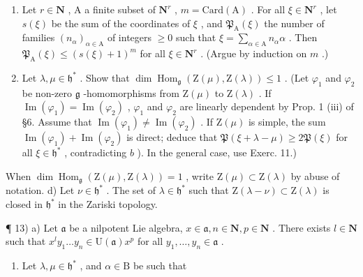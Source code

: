 \begin{enumerate}
\def\labelenumi{\alph{enumi})}
\setcounter{enumi}{1}
\item
  Let \(r \in \mathbf{N}\) , A a finite subset of \(\mathbf{N}^r\) , \(m = \mathrm{Card}(\mathrm{A})\) . For all \(\xi \in \mathbf{N}^r\) , let \(s(\xi)\) be the sum of the coordinates of \(\xi\) , and \(\mathfrak{P}_{\mathrm{A}}(\xi)\) the number of families \((n_{\alpha})_{\alpha \in \mathrm{A}}\) of integers \(\geq 0\) such that \(\xi = \sum_{\alpha \in \mathrm{A}} n_{\alpha}\alpha\) . Then \(\mathfrak{P}_{\mathrm{A}}(\xi) \leq (s(\xi) + 1)^m\) for all \(\xi \in \mathbf{N}^r\) . (Argue by induction on \(m\) .)
\item
  Let \(\lambda, \mu \in \mathfrak{h}^*\) . Show that \(\dim \operatorname{Hom}_{\mathfrak{g}}(\mathrm{Z}(\mu), \mathrm{Z}(\lambda)) \leq 1\) . (Let \(\varphi_1\) and \(\varphi_2\) be non-zero \(\mathfrak{g}\) -homomorphisms from \(\mathrm{Z}(\mu)\) to \(\mathrm{Z}(\lambda)\) . If \(\operatorname{Im}(\varphi_1) = \operatorname{Im}(\varphi_2)\) , \(\varphi_1\) and \(\varphi_2\) are linearly dependent by Prop. 1 (iii) of §6. Assume that \(\operatorname{Im}(\varphi_1) \neq \operatorname{Im}(\varphi_2)\) . If \(\mathrm{Z}(\mu)\) is simple, the sum \(\operatorname{Im}(\varphi_1) + \operatorname{Im}(\varphi_2)\) is direct; deduce that \(\mathfrak{P}(\xi + \lambda - \mu) \geq 2\mathfrak{P}(\xi)\) for all \(\xi \in \mathfrak{h}^*\) , contradicting \(b\) ). In the general case, use Exerc. 11.)
\end{enumerate}

When \(\dim\operatorname{Hom}_{\mathfrak{g}}(\mathrm{Z}(\mu),\mathrm{Z}(\lambda))=1\) , write \(\mathrm{Z}(\mu)\subset\mathrm{Z}(\lambda)\) by abuse of notation. d) Let \(\nu\in\mathfrak{h}^{*}\) . The set of \(\lambda\in\mathfrak{h}^{*}\) such that \(\mathrm{Z}(\lambda-\nu)\subset\mathrm{Z}(\lambda)\) is closed in \(\mathfrak{h}^{*}\) in the Zariski topology.

¶ 13) a) Let \(\mathfrak{a}\) be a nilpotent Lie algebra, \(x \in \mathfrak{a}, n \in \mathbf{N}, p \in \mathbf{N}\) . There exists \(l \in \mathbf{N}\) such that \(x^{l}y_{1} \ldots y_{n} \in \mathrm{U}(\mathfrak{a})x^{p}\) for all \(y_{1}, \ldots, y_{n} \in \mathfrak{a}\) .

\begin{enumerate}
\def\labelenumi{\alph{enumi})}
\setcounter{enumi}{1}
\tightlist
\item
  Let \(\lambda, \mu \in \mathfrak{h}^*\) , and \(\alpha \in \mathrm{B}\) be such that
\end{enumerate}

